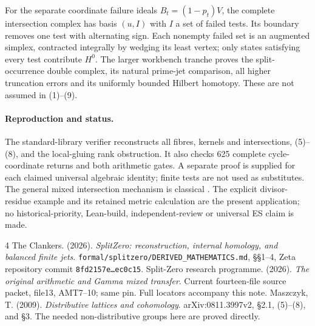 \documentclass[10pt,a4paper]{article}
\begin{document}
For the separate coordinate failure ideals $B_t=(1-p_t)V$, the complete
intersection complex has basis $(u,I)$ with $I$ a set of failed tests.
Its boundary removes one test with alternating sign. Each nonempty failed
set is an augmented simplex, contracted integrally by wedging its least
vertex; only states satisfying every test contribute $H^0$. The larger
workbench tranche proves the split-occurrence double complex, its natural
prime-jet comparison, all higher truncation errors and its uniformly bounded
Hilbert homotopy. These are not assumed in (1)--(9).

\paragraph{Reproduction and status.}
The standard-library verifier reconstructs all fibres, kernels and
intersections, (5)--(8), and the local-gluing rank obstruction. It also checks
625 complete cycle-coordinate returns and both arithmetic gates. A separate
proof is supplied for each claimed universal algebraic identity; finite tests
are not used as substitutes. The general mixed intersection mechanism is
classical \cite{Mas}. The explicit divisor-residue example and its retained
metric calculation are the present application; no historical-priority,
Lean-build, independent-review or universal ES claim is made.

\begingroup\small
\begin{thebibliography}{4}
 The Clankers. (2026). \emph{SplitZero: reconstruction, internal homology, and balanced finite jets}. \texttt{formal/splitzero/DERIVED\_MATHEMATICS.md}, \S\S1--4, Zeta repository commit \texttt{8fd2157e\ldots{}ec0c15}.
 Split-Zero research programme. (2026). \emph{The original arithmetic and Gamma mixed transfer}. Current fourteen-file source packet, file13, AMT7--10; same pin. Full locators accompany this note.
 Maszczyk, T. (2009). \emph{Distributive lattices and cohomology}. arXiv:0811.3997v2, \S2.1, (5)--(8), and \S3. The needed non-distributive groups here are proved directly.
\end{thebibliography}
\endgroup
\end{document}
